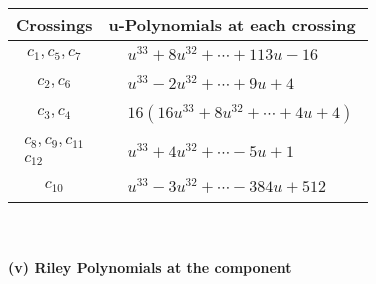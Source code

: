 \documentclass[1p]{elsarticle_modified}
\theoremstyle{definition}
\begin{document}
\begin{tabular}{m{50pt}|m{274pt}}
Crossings & \hspace{64pt}u-Polynomials at each crossing \\
\hline $$\begin{aligned}c_{1},c_{5},c_{7}\end{aligned}$$&$\begin{aligned}
&u^{33}+8 u^{32}+\cdots+113 u-16
\end{aligned}$\\
\hline $$\begin{aligned}c_{2},c_{6}\end{aligned}$$&$\begin{aligned}
&u^{33}-2 u^{32}+\cdots+9 u+4
\end{aligned}$\\
\hline $$\begin{aligned}c_{3},c_{4}\end{aligned}$$&$\begin{aligned}
&16(16 u^{33}+8 u^{32}+\cdots+4 u+4)
\end{aligned}$\\
\hline $$\begin{aligned}c_{8},c_{9},c_{11}\\c_{12}\end{aligned}$$&$\begin{aligned}
&u^{33}+4 u^{32}+\cdots-5 u+1
\end{aligned}$\\
\hline $$\begin{aligned}c_{10}\end{aligned}$$&$\begin{aligned}
&u^{33}-3 u^{32}+\cdots-384 u+512
\end{aligned}$\\
\hline
\end{tabular}\\~\\
\newpage\renewcommand{\arraystretch}{1}
\flushleft \textbf{(v) Riley Polynomials at the component}\newline \\
\end{document}
